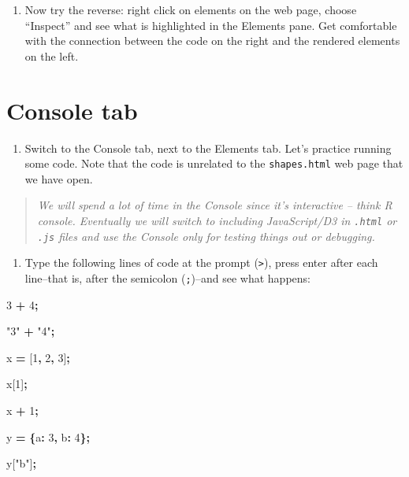 \documentclass[openany]{book}
\newenvironment{Shaded}{\begin{snugshade}}{\end{snugshade}}
\newcommand{\DataTypeTok}[1]{\textcolor[rgb]{0.13,0.29,0.53}{#1}}
\newcommand{\DecValTok}[1]{\textcolor[rgb]{0.00,0.00,0.81}{#1}}
\newcommand{\NormalTok}[1]{#1}
\newcommand{\OperatorTok}[1]{\textcolor[rgb]{0.81,0.36,0.00}{\textbf{#1}}}
\newcommand{\StringTok}[1]{\textcolor[rgb]{0.31,0.60,0.02}{#1}}
\providecommand{\tightlist}{%
  \setlength{\itemsep}{0pt}\setlength{\parskip}{0pt}}
\begin{document}
\begin{enumerate}
\def\labelenumi{\arabic{enumi}.}
\setcounter{enumi}{2}
\tightlist
\item
  Now try the reverse: right click on elements on the web page, choose ``Inspect'' and see what is highlighted in the Elements pane. Get comfortable with the connection between the code on the right and the rendered elements on the left.
\end{enumerate}

\hypertarget{console-tab}{%
\section{Console tab }\label{console-tab}}

\begin{enumerate}
\def\labelenumi{\arabic{enumi}.}
\tightlist
\item
  Switch to the Console tab, next to the Elements tab. Let's practice running some code. Note that the code is unrelated to the \texttt{shapes.html} web page that we have open.
\end{enumerate}

\begin{quote}
 \emph{We will spend a lot of time in the Console since it's interactive -- think R console. Eventually we will switch to including JavaScript/D3 in \texttt{.html} or \texttt{.js} files and use the Console only for testing things out or debugging.}
\end{quote}

\begin{enumerate}
\def\labelenumi{\arabic{enumi}.}
\setcounter{enumi}{1}
\tightlist
\item
  Type the following lines of code at the prompt (\texttt{\textgreater{}}), press enter after each line--that is, after the semicolon (\texttt{;})--and see what happens:
\end{enumerate}

\begin{Shaded}
\begin{Highlighting}[]
\DecValTok{3} \OperatorTok{+} \DecValTok{4}\OperatorTok{;}
    
\StringTok{"3"} \OperatorTok{+} \StringTok{"4"}\OperatorTok{;}

\NormalTok{ x }\OperatorTok{=}\NormalTok{ [}\DecValTok{1}\OperatorTok{,} \DecValTok{2}\OperatorTok{,} \DecValTok{3}\NormalTok{]}\OperatorTok{;}
    
\NormalTok{x[}\DecValTok{1}\NormalTok{]}\OperatorTok{;}
    
\NormalTok{x }\OperatorTok{+} \DecValTok{1}\OperatorTok{;}
    
\NormalTok{y }\OperatorTok{=} \OperatorTok{\{}\DataTypeTok{a}\OperatorTok{:} \DecValTok{3}\OperatorTok{,} \DataTypeTok{b}\OperatorTok{:} \DecValTok{4}\OperatorTok{\};}
    
\NormalTok{y[}\StringTok{"b"}\NormalTok{]}\OperatorTok{;}
\end{Highlighting}
\end{Shaded}
\end{document}
